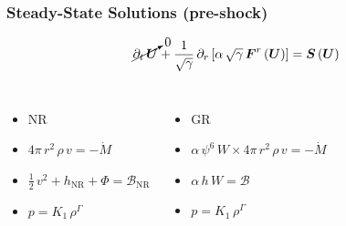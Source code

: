 \documentclass{beamer}
\newcommand{\p}{\partial}
\newcommand{\bs}{\boldsymbol}
\newcommand{\nr}{\mathrm{NR}}
\newcommand{\mdot}{\dot{M}}
\begin{document}
\begin{frame}
\frametitle{Steady-State Solutions (pre-shock)}

  \begin{equation*}
    \cancelto{0}{\p_{t}\,\bs{U}}
    +\frac{1}{\sqrt{\gamma}}\,
    \p_{r}\left[\alpha\,\sqrt{\gamma}\,\bs{F}^{r}\left(\bs{U}\right)\right]
    =\bs{S}\left(\bs{U}\right)
  \end{equation*}

  \begin{columns}[c]


    \begin{itemize}[<+->]
      \item[]
        NR
      \item[]
        $4\pi\,r^{2}\,\rho\,v=-\mdot$
      \item[]
        $\frac{1}{2}\,v^{2}+h_{\nr}+\Phi=\mathcal{B}_{\nr}$
      \item[]
        $p=K_{1}\,\rho^{\Gamma}$
    \end{itemize}


    \begin{itemize}[<+->]
      \item[]
        GR
      \item[]
        $\alpha\,\psi^{6}\,W\times4\pi\,r^{2}\,\rho\,v=-\mdot$
      \item[]
        $\alpha\,h\,W=\mathcal{B}$
      \item[]
        $p=K_{1}\,\rho^{\Gamma}$
    \end{itemize}

  \end{columns}

\end{frame}
\end{document}
